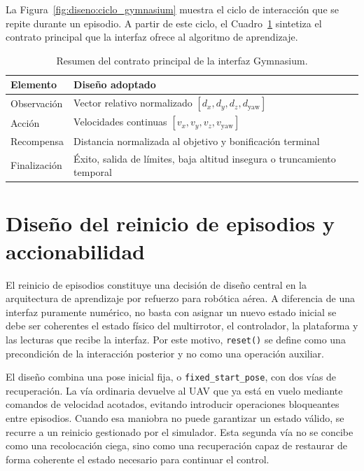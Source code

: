 La Figura~\ref{fig:diseno:ciclo_gymnasium} muestra el ciclo de interacción que
se repite durante un episodio. A partir de este ciclo, el
Cuadro~\ref{tab:diseno:contrato_entorno} sintetiza el contrato principal que la
interfaz ofrece al algoritmo de aprendizaje.

\begin{table}[h]
    \centering
    \begin{tabular}{ll}
        \hline
        Elemento & Diseño adoptado \\
        \hline
        Observación & Vector relativo normalizado $[d_x,d_y,d_z,d_{\mathrm{yaw}}]$ \\
        Acción & Velocidades continuas $[v_x,v_y,v_z,v_{\mathrm{yaw}}]$ \\
        Recompensa & Distancia normalizada al objetivo y bonificación terminal \\
        Finalización & Éxito, salida de límites, baja altitud insegura o truncamiento temporal \\
        \hline
    \end{tabular}
    \caption{Resumen del contrato principal de la interfaz Gymnasium.}
    \label{tab:diseno:contrato_entorno}
\end{table}



\section{Diseño del reinicio de episodios y accionabilidad} \label{sct:diseno:reset_accionabilidad}

El reinicio de episodios constituye una decisión de diseño central en la arquitectura
de aprendizaje por refuerzo para robótica aérea. A diferencia de una interfaz
puramente numérico, no basta con asignar un nuevo estado inicial se debe ser
coherentes el estado físico del multirrotor, el controlador, la plataforma y las
lecturas que recibe la interfaz. Por este motivo, \texttt{reset()} se define como
una precondición de la interacción posterior y no como una operación auxiliar.

El diseño combina una pose inicial fija, o \texttt{fixed\_start\_pose}, con dos
vías de recuperación. La vía ordinaria devuelve al UAV que ya está en vuelo
mediante comandos de velocidad acotados, evitando introducir operaciones
bloqueantes entre episodios. Cuando esa maniobra no puede garantizar un estado
válido, se recurre a un reinicio gestionado por el simulador. Esta segunda vía no
se concibe como una recolocación ciega, sino como una recuperación capaz de
restaurar de forma coherente el estado necesario para continuar el control.

